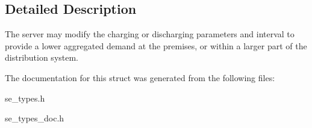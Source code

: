 \subsection{Detailed Description}
The server may modify the charging or discharging parameters and interval to provide a lower aggregated demand at the premises, or within a larger part of the distribution system. 

The documentation for this struct was generated from the following files\+:\begin{DoxyCompactItemize}
\item 
se\+\_\+types.\+h\item 
se\+\_\+types\+\_\+doc.\+h\end{DoxyCompactItemize}
